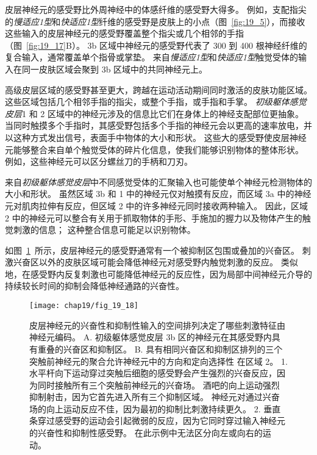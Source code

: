 皮层神经元的感受野比外周神经中的体感纤维的感受野大得多。
例如，支配指尖的\textit{慢适应1型}和\textit{快适应1型}纤维的感受野是皮肤上的小点（图~\ref{fig:19_5}），而接收这些输入的皮层神经元的感受野覆盖整个指尖或几个相邻的手指（图~\ref{fig:19_17}B）。
3b 区域中神经元的感受野代表了 300 到 400 根神经纤维的复合输入，通常覆盖单个指骨或掌垫。
来自\textit{慢适应1型}和\textit{快适应1型}触觉受体的输入在同一皮肤区域会聚到 3b 区域中的共同神经元上。


高级皮层区域的感受野甚至更大，跨越在运动活动期间同时激活的皮肤功能区域。
这些区域包括几个相邻手指的指尖，或整个手指，或手指和手掌。
\textit{初级躯体感觉皮层}1  和 2 区域中的神经元涉及的信息比它们在身体上的神经支配部位更抽象。
当同时触摸多个手指时，其感受野包括多个手指的神经元会以更高的速率放电，并以这种方式发出信号，表面手中物体的大小和形状。
这些大的感受野使皮层神经元能够整合来自单个触觉受体的碎片化信息，使我们能够识别物体的整体形状。
例如，这些神经元可以区分螺丝刀的手柄和刀刃。


来自\textit{初级躯体感觉皮层}中不同感觉受体的汇聚输入也可能使单个神经元检测物体的大小和形状。
虽然区域 3b 和 1 中的神经元仅对触摸有反应，而区域 3a 中的神经元对肌肉拉伸有反应，但区域 2 中的许多神经元同时接收两种输入。
因此，区域 2 中的神经元可以整合有关用于抓取物体的手形、手施加的握力以及物体产生的触觉刺激的信息；
这种整合信息可能足以识别物体。


如图~\ref{fig:19_18}~所示，皮层神经元的感受野通常有一个被抑制区包围或叠加的兴奋区。
刺激兴奋区以外的皮肤区域可能会降低神经元对感受野内触觉刺激的反应。
类似地，在感受野内反复刺激也可能降低神经元的反应性，因为局部中间神经元介导的持续较长时间的抑制会降低神经通路的兴奋性。


\begin{figure}[htbp]
	\centering
	\texttt{[image: chap19/fig\_19\_18]}
	\caption{皮层神经元的兴奋性和抑制性输入的空间排列决定了哪些刺激特征由神经元编码。
		A. 初级躯体感觉皮层 3b 区的神经元在其感受野内具有重叠的兴奋区和抑制区\cite{dicarlo1998structure,sripati2006spatiotemporal}。
		B. 具有相同兴奋区和抑制区排列的三个突触前神经元的聚合允许神经元中的方向和定向选择性 在区域 2。 
		1. 水平杆向下运动穿过突触后细胞的感受野会产生强烈的兴奋反应，因为同时接触所有三个突触前神经元的兴奋场。
		酒吧的向上运动强烈抑制射击，因为它首先进入所有三个抑制区域。
		神经元对通过兴奋场的向上运动反应不佳，因为最初的抑制比刺激持续更久。
		2. 垂直条穿过感受野的运动会引起微弱的反应，因为它同时穿过输入神经元的兴奋性和抑制性感受野。
		在此示例中无法区分向左或向右的运动。}
	\label{fig:19_18}
\end{figure}


